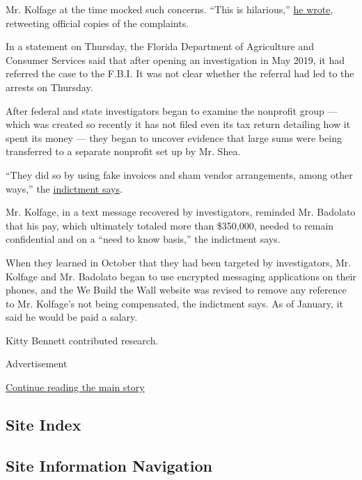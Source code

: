 Mr. Kolfage at the time mocked such concerns. ``This is hilarious,''
\href{https://twitter.com/BrianKolfage/status/1158957245612417029?ref_src=twsrc\%5Etfw\%7Ctwcamp\%5Etweetembed\%7Ctwterm\%5E1158957245612417029\%7Ctwgr\%5E\&ref_url=https\%3A\%2F\%2Fabcnews.go.com\%2FUS\%2Fbuild-wall-group-privately-funded-border-wall-criminal\%2Fstory\%3Fid\%3D64827607}{he
wrote}, retweeting official copies of the complaints.

In a statement on Thursday, the Florida Department of Agriculture and
Consumer Services said that after opening an investigation in May 2019,
it had referred the case to the F.B.I. It was not clear whether the
referral had led to the arrests on Thursday.

After federal and state investigators began to examine the nonprofit
group --- which was created so recently it has not filed even its tax
return detailing how it spent its money --- they began to uncover
evidence that large sums were being transferred to a separate nonprofit
set up by Mr. Shea.

``They did so by using fake invoices and sham vendor arrangements, among
other ways,'' the
\href{https://int.graylady3jvrrxbe.onion/data/documenttools/u-s-v-brian-kolfage-stephen-bannon-et-al/e56f197b430d0fcb/full.pdf}{indictment
says}.

Mr. Kolfage, in a text message recovered by investigators, reminded Mr.
Badolato that his pay, which ultimately totaled more than \$350,000,
needed to remain confidential and on a ``need to know basis,'' the
indictment says.

When they learned in October that they had been targeted by
investigators, Mr. Kolfage and Mr. Badolato began to use encrypted
messaging applications on their phones, and the We Build the Wall
website was revised to remove any reference to Mr. Kolfage's not being
compensated, the indictment says. As of January, it said he would be
paid a salary.

Kitty Bennett contributed research.

Advertisement

\protect\hyperlink{after-bottom}{Continue reading the main story}

\hypertarget{site-index}{%
\subsection{Site Index}\label{site-index}}

\hypertarget{site-information-navigation}{%
\subsection{Site Information
Navigation}\label{site-information-navigation}}

